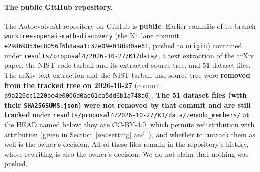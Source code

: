 \documentclass[10pt]{article}
\begin{document}
\paragraph{The public GitHub repository.} The AutoevolveAI repository on GitHub is \textbf{public}. Earlier commits of its branch \texttt{worktree-openai-math-discovery} (the K1 lane commit \texttt{e29869853ec8056f6b8aaa1c32e09e018b80ae61}, pushed to \texttt{origin}) contained, under \texttt{results/proposal4/2026-10-27/K1/data/}, a text extraction of the arXiv paper, the NIST code tarball and its extracted source tree, and 51 dataset files. The arXiv text extraction and the NIST tarball and source tree were \textbf{removed from the tracked tree on 2026-10-27} (commit \texttt{b9a226cc1220be4e0006d0ae61ca5dd6b1a748a6}). \textbf{The 51 dataset files (with their \texttt{SHA256SUMS.json}) were not removed by that commit and are still tracked} under \texttt{results/proposal4/2026-10-27/K1/data/zenodo\_members/} at the HEAD named below; they are CC-BY-4.0, which permits redistribution with attribution (given in Section~\ref{sec:setting} and~\cite{zen}), and whether to untrack them as well is the owner's decision. All of these files remain in the repository's history, whose rewriting is also the owner's decision. We do not claim that nothing was pushed.
\end{document}
